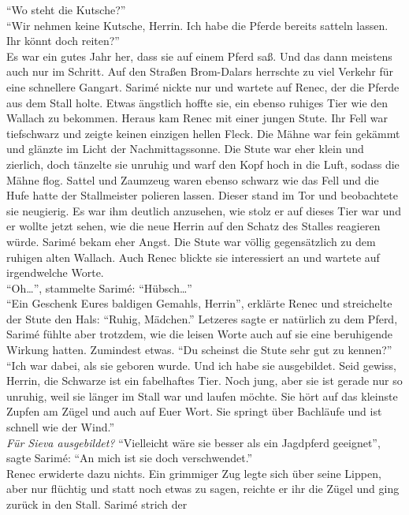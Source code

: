  ``Wo steht die Kutsche?''\\
``Wir nehmen keine Kutsche, Herrin. Ich habe die Pferde bereits satteln lassen. Ihr könnt doch 
reiten?''\\
Es war ein gutes Jahr her, dass sie auf einem Pferd saß. Und das dann meistens auch nur im Schritt. 
Auf den Straßen Brom-Dalars herrschte zu viel Verkehr für eine schnellere Gangart. Sarimé nickte 
nur und wartete auf Renec, der die Pferde aus dem Stall holte. Etwas ängstlich hoffte sie, ein 
ebenso ruhiges Tier wie den Wallach zu bekommen. Heraus kam Renec mit einer jungen Stute. Ihr Fell 
war tiefschwarz und zeigte keinen einzigen hellen Fleck. Die Mähne war fein gekämmt und glänzte im 
Licht der Nachmittagssonne. Die Stute war eher klein und zierlich, doch tänzelte sie unruhig und 
warf den Kopf hoch in die Luft, sodass die Mähne flog. Sattel und Zaumzeug waren ebenso schwarz wie 
das Fell und die Hufe hatte der Stallmeister polieren lassen. Dieser stand im Tor und beobachtete 
sie neugierig. Es war ihm deutlich anzusehen, wie stolz er auf dieses Tier war und er wollte jetzt 
sehen, wie die neue Herrin auf den Schatz des Stalles reagieren würde. Sarimé bekam eher Angst. Die 
Stute war völlig gegensätzlich zu dem ruhigen alten Wallach. Auch Renec blickte sie interessiert an 
und wartete auf irgendwelche Worte.\\
``Oh…'', stammelte Sarimé: ``Hübsch…''\\
``Ein Geschenk Eures baldigen Gemahls, Herrin'', erklärte Renec und streichelte der Stute den Hals: 
``Ruhig, Mädchen.'' Letzeres sagte er natürlich zu dem Pferd, Sarimé fühlte aber trotzdem, wie die 
leisen Worte auch auf sie eine beruhigende Wirkung hatten. Zumindest etwas.
``Du scheinst die Stute sehr gut zu kennen?''\\
``Ich war dabei, als sie geboren wurde. Und ich habe sie ausgebildet. Seid gewiss, Herrin, die 
Schwarze ist ein fabelhaftes Tier. Noch jung, aber sie ist gerade nur so unruhig, weil sie länger 
im Stall war und laufen möchte. Sie hört auf das kleinste Zupfen am Zügel und auch auf Euer Wort. 
Sie springt über Bachläufe und ist schnell wie der Wind.''\\
\textit{Für Sieva ausgebildet?}
``Vielleicht wäre sie besser als ein Jagdpferd geeignet'', sagte Sarimé: ``An mich ist sie doch 
verschwendet.''\\
Renec erwiderte dazu nichts. Ein grimmiger Zug legte sich über seine Lippen, aber nur flüchtig und 
statt noch etwas zu sagen, reichte er ihr die Zügel und ging zurück in den Stall. Sarimé strich der 
